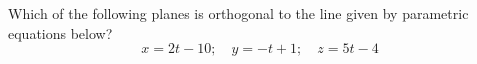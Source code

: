 \documentclass{ximera}
\author{}
\begin{document}
\begin{exercise}
Which of the following planes is orthogonal to the line given by parametric equations below?
$$x=2t-10;\quad y=-t+1;\quad z=5t-4$$

\begin{multipleChoice}
 \end{multipleChoice}
\end{exercise}
\end{document}
